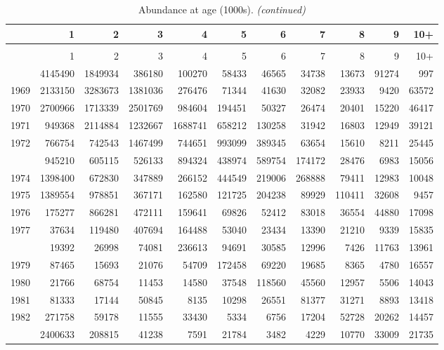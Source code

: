 \documentclass[
]{article}
\begin{document}
\begin{longtable}[t]{lrrrrrrrrrr}
\caption{\label{tab:NAA-table}Abundance at age (1000s).}\\
\toprule
  & 1 & 2 & 3 & 4 & 5 & 6 & 7 & 8 & 9 & 10+\\
\midrule
\endfirsthead
\caption[]{Abundance at age (1000s). \textit{(continued)}}\\
\toprule
  & 1 & 2 & 3 & 4 & 5 & 6 & 7 & 8 & 9 & 10+\\
\midrule
\endhead

\endfoot
\bottomrule
\endlastfoot
1968 & 4145490 & 1849934 & 386180 & 100270 & 58433 & 46565 & 34738 & 13673 & 91274 & 997\\
1969 & 2133150 & 3283673 & 1381036 & 276476 & 71344 & 41630 & 32082 & 23933 & 9420 & 63572\\
1970 & 2700966 & 1713339 & 2501769 & 984604 & 194451 & 50327 & 26474 & 20401 & 15220 & 46417\\
1971 & 949368 & 2114884 & 1232667 & 1688741 & 658212 & 130258 & 31942 & 16803 & 12949 & 39121\\
1972 & 766754 & 742543 & 1467499 & 744651 & 993099 & 389345 & 63654 & 15610 & 8211 & 25445\\
\addlinespace
1973 & 945210 & 605115 & 526133 & 894324 & 438974 & 589754 & 174172 & 28476 & 6983 & 15056\\
1974 & 1398400 & 672830 & 347889 & 266152 & 444549 & 219006 & 268888 & 79411 & 12983 & 10048\\
1975 & 1389554 & 978851 & 367171 & 162580 & 121725 & 204238 & 89929 & 110411 & 32608 & 9457\\
1976 & 175277 & 866281 & 472111 & 159641 & 69826 & 52412 & 83018 & 36554 & 44880 & 17098\\
1977 & 37634 & 119480 & 407694 & 164488 & 53040 & 23434 & 13390 & 21210 & 9339 & 15835\\
\addlinespace
1978 & 19392 & 26998 & 74081 & 236613 & 94691 & 30585 & 12996 & 7426 & 11763 & 13961\\
1979 & 87465 & 15693 & 21076 & 54709 & 172458 & 69220 & 19685 & 8365 & 4780 & 16557\\
1980 & 21766 & 68754 & 11453 & 14580 & 37548 & 118560 & 45560 & 12957 & 5506 & 14043\\
1981 & 81333 & 17144 & 50845 & 8135 & 10298 & 26551 & 81377 & 31271 & 8893 & 13418\\
1982 & 271758 & 59178 & 11555 & 33430 & 5334 & 6756 & 17204 & 52728 & 20262 & 14457\\
\addlinespace
1983 & 2400633 & 208815 & 41238 & 7591 & 21784 & 3482 & 4229 & 10770 & 33009 & 21735\\

\end{longtable}
\end{document}

